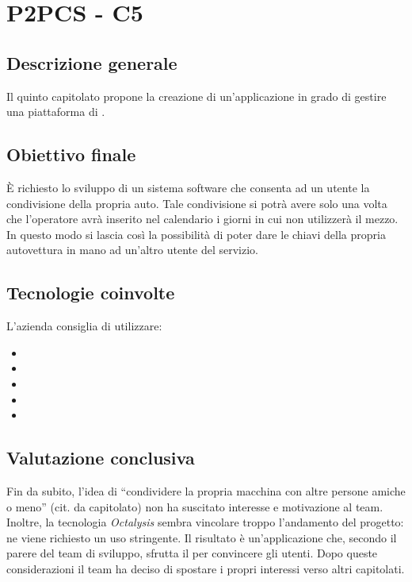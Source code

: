 \section{P2PCS - C5} \label{c5}
    \subsection{Descrizione generale}
    Il quinto capitolato propone la creazione di un'applicazione  in grado di gestire una piattaforma di 
    .

    \subsection{Obiettivo finale}
    \`E richiesto lo sviluppo di un sistema software che consenta ad un utente la condivisione della propria auto. Tale condivisione si potrà
    avere solo una volta che l'operatore avrà inserito nel calendario i giorni in cui non utilizzerà il mezzo.
    In questo modo si lascia così la possibilità di poter dare le chiavi della propria autovettura in mano ad un'altro utente del servizio.

    \subsection{Tecnologie coinvolte}
    L'azienda consiglia di utilizzare:
        \begin{itemize}
        \item {}
        \item {}
        \item {}
        \item {}
        \item {}
    \end{itemize}

    \subsection{Valutazione conclusiva}
    Fin da subito, l'idea di ``condividere la propria macchina con altre persone amiche o meno'' (cit. da capitolato) non ha suscitato interesse
    e motivazione al team. Inoltre, la tecnologia \textit{Octalysis} sembra vincolare troppo l'andamento del progetto: ne viene richiesto un
    uso stringente. Il risultato è un'applicazione che, secondo il parere del team di sviluppo, sfrutta il  per convincere gli utenti.
    Dopo queste considerazioni il team ha deciso di spostare i propri interessi verso altri capitolati.
